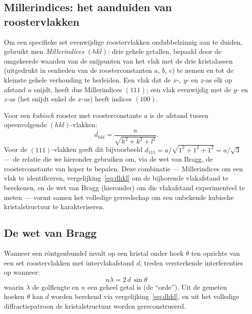 \subsection{Millerindices: het aanduiden van roostervlakken}
\label{sec:miller}

Om een specifieke set evenwijdige roostervlakken ondubbelzinnig aan te duiden, gebruikt men \emph{Millerindices} $(hkl)$: drie gehele getallen, bepaald door de omgekeerde waarden van de snijpunten van het vlak met de drie kristalassen (uitgedrukt in eenheden van de roosterconstanten $a$, $b$, $c$) te nemen en tot de kleinste gehele verhouding te herleiden. Een vlak dat de $x$-, $y$- en $z$-as elk op afstand $a$ snijdt, heeft dus Millerindices $(111)$; een vlak evenwijdig met de $y$- en $z$-as (het snijdt enkel de $x$-as) heeft indices $(100)$.

Voor een \emph{kubisch} rooster met roosterconstante $a$ is de afstand tussen opeenvolgende $(hkl)$-vlakken:
\begin{equation}
\boxed{\;d_{hkl} = \frac{a}{\sqrt{h^2+k^2+l^2}}.\;}
\label{eq:dhkl}
\end{equation}
Voor de $(111)$-vlakken geeft dit bijvoorbeeld $d_{111}=a/\sqrt{1^2+1^2+1^2}=a/\sqrt3$ --- de relatie die we hieronder gebruiken om, via de wet van Bragg, de roosterconstante van koper te bepalen. Deze combinatie --- Millerindices om een vlak te identificeren, vergelijking~\eqref{eq:dhkl} om de bijhorende vlakafstand te berekenen, en de wet van Bragg (hieronder) om die vlakafstand experimenteel te meten --- vormt samen het volledige gereedschap om een onbekende kubische kristalstructuur te karakteriseren.

\subsection{De wet van Bragg}
\label{sec:bragg}

Wanneer een r\"ontgenbundel invalt op een kristal onder hoek $\theta$ ten opzichte van een set roostervlakken met intervlakafstand $d$, treden versterkende interferenties op wanneer:
\begin{equation}
\boxed{\;n\lambda = 2\,d\,\sin\theta\;}
\label{eq:bragg}
\end{equation}
waarin $\lambda$ de golflengte en $n$ een geheel getal is (de ``orde''). Uit de gemeten hoeken $\theta$ kan $d$ worden berekend via vergelijking~\eqref{eq:dhkl}, en uit het volledige diffractiepatroon de kristalstructuur worden gereconstrueerd.

